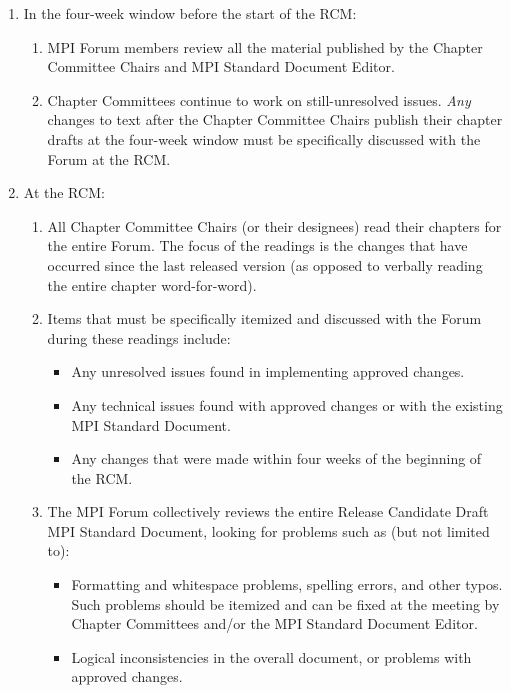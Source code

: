 \begin{enumerate}
\item In the four-week window before the start of the RCM:
  \begin{enumerate}
  \item MPI Forum members review all the material published by the
    Chapter Committee Chairs and MPI Standard Document Editor.
  \item Chapter Committees continue to work on still-unresolved
    issues.  {\em Any} changes to text after the {\color{red}Chapter
      Committee Chairs publish their chapter drafts} at the four-week
    window must be specifically discussed with the Forum at the RCM.
  \end{enumerate}

\item At the RCM:
  \begin{enumerate}
  \item All Chapter Committee Chairs (or their designees) read their
    chapters for the entire Forum.  The focus of the readings is the
    changes that have occurred since the last released version (as
    opposed to verbally reading the entire chapter word-for-word).
  \item Items that must be specifically itemized and discussed with
    the Forum during these readings include:
    \begin{itemize}
    \item Any unresolved issues found in implementing approved
      changes.
    \item Any technical issues found with approved changes or with the
      existing MPI Standard Document.
    \item Any changes that were made within four weeks of the
      beginning of the RCM.
    \end{itemize}

  \item The MPI Forum collectively reviews the entire Release
    Candidate Draft MPI Standard Document, looking for problems such
    as (but not limited to):
    \begin{itemize}
    \item Formatting and whitespace problems, spelling errors, and
      other typos.  Such problems should be itemized and can be fixed
      at the meeting by Chapter Committees and/or the MPI Standard
      Document Editor.
    \item Logical inconsistencies in the overall document, or problems
      with approved changes.
    \end{itemize}


\end{enumerate}
\end{enumerate}
